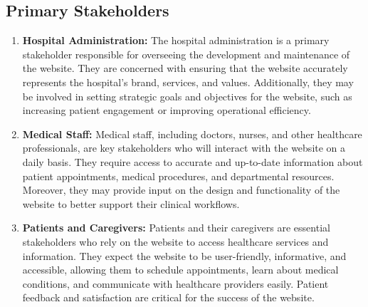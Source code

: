 \documentclass{article}
\begin{document}
\subsection{Primary Stakeholders}
\begin{enumerate}
    \item \textbf{Hospital Administration:} The hospital administration is a primary stakeholder responsible for overseeing the development and maintenance of the website. They are concerned with ensuring that the website accurately represents the hospital's brand, services, and values. Additionally, they may be involved in setting strategic goals and objectives for the website, such as increasing patient engagement or improving operational efficiency.
    
    \item \textbf{Medical Staff:} Medical staff, including doctors, nurses, and other healthcare professionals, are key stakeholders who will interact with the website on a daily basis. They require access to accurate and up-to-date information about patient appointments, medical procedures, and departmental resources. Moreover, they may provide input on the design and functionality of the website to better support their clinical workflows.
    
    \item \textbf{Patients and Caregivers:} Patients and their caregivers are essential stakeholders who rely on the website to access healthcare services and information. They expect the website to be user-friendly, informative, and accessible, allowing them to schedule appointments, learn about medical conditions, and communicate with healthcare providers easily. Patient feedback and satisfaction are critical for the success of the website.
\end{enumerate}
\end{document}
